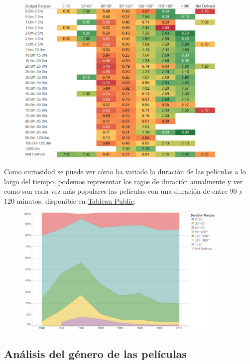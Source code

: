 \documentclass{article}
\begin{document}
\begin{figure}[h]
\centering
\includegraphics[width=4in,clip,keepaspectratio]{./images/budget_duration}
\end{figure}

\clearpage

Como curiosidad se puede ver cómo ha variado la duración de las películas a lo largo del tiempo\cite{justgeek}, podemos representar los ragos de duración anualmente y ver como son cada vez más populares las películas con una duración de entre 90 y 120 minutos, disponible en \href{https://public.tableau.com/profile/javier6580\#!/vizhome/proyecto_fin_de_master_dataset/duration_year}{Tableau Public}:

\begin{figure}[h]
\centering
\includegraphics[width=4in,clip,keepaspectratio]{./images/duration_year}
\end{figure}


\subsection{Análisis del género de las películas}
\end{document}
